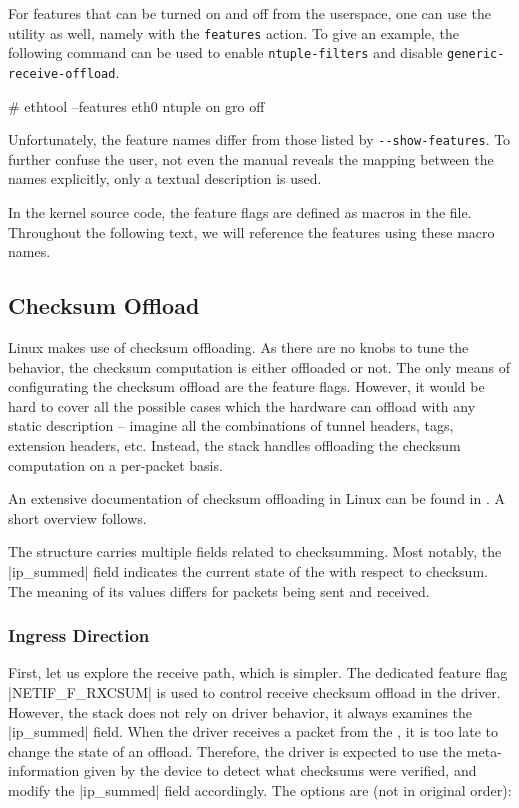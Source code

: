 For features that can be turned on and off from the userspace, one can use the
 utility as well, namely with the \texttt{features} action. To give
an example, the following command can be used to enable \texttt{ntuple-filters}
and disable \texttt{generic-receive-offload}.

\begin{shell}
# ethtool --features eth0 ntuple on gro off
\end{shell}

Unfortunately, the feature names differ from those listed by
\Verb|--show-features|. To further confuse the user, not even the manual
reveals the mapping between the names explicitly, only a textual description is used.

In the kernel source code, the feature flags are defined as macros in the
 file. Throughout the following text, we
will reference the features using these macro names.

\subsection{Checksum Offload}
\label{sec:linux-csum}

Linux makes use of checksum offloading. As there are no knobs to tune the
behavior, the checksum computation is either offloaded or not. The only means
of configurating the checksum offload are the feature flags. However, it would
be hard to cover all the possible cases which the hardware can offload with any
static description -- imagine all the combinations of tunnel headers, 
tags,  extension headers, etc. Instead, the stack handles offloading
the checksum computation on a per-packet basis.

An extensive documentation of checksum offloading in Linux can be found in
. A short overview follows.

The \skb{} structure carries multiple fields related to checksumming. Most
notably, the \field|ip_summed| field indicates the current state of the \skb{}
with respect to checksum. The meaning of its values differs for packets being
sent and received.

\subsubsection{Ingress Direction}

First, let us explore the receive path, which is simpler. The dedicated feature
flag \macro|NETIF_F_RXCSUM| is used to control receive checksum offload in the
driver. However, the stack does not rely on driver behavior, it always examines
the \field|ip_summed| field. When the driver receives a packet from
the , it is too late to change the state of an offload. Therefore, the
driver is expected to use the meta-information given by the device to detect what
checksums were verified, and modify the \field|ip_summed| field accordingly.
The options are (not in original order):

